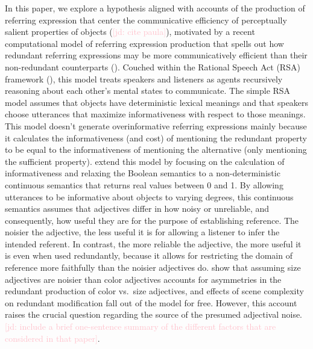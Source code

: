 \documentclass[12pt,letterpaper]{article}
\newcommand{\jd}[1]{\textcolor{Pink}{[jd: #1]}}
\begin{document}
In this paper, we explore a hypothesis aligned with accounts of the production of referring expression that center the communicative efficiency of perceptually salient properties of objects (\jd{cite paula}), motivated by a recent computational model  of referring expression production that spells out how redundant referring expressions may be more communicatively efficient than their non-redundant counterparts (\citealt{DegenEtAl2020}). Couched within the Rational Speech Act (RSA) framework (\citealt{Goodman2016}), this model treats speakers and listeners as agents recursively reasoning about each other's mental states to communicate. The simple RSA model assumes that objects have deterministic lexical meanings and that speakers choose utterances that maximize informativeness with respect to those meanings. This model doesn't generate overinformative referring expressions mainly because it calculates the informativeness (and cost) of mentioning the redundant property to be equal to the informativeness of mentioning the alternative (only mentioning the sufficient property). \citet{DegenEtAl2020} extend this model by focusing on the calculation of informativeness and relaxing the Boolean semantics to a non-deterministic continuous semantics that returns real values between 0 and 1. By allowing utterances to be informative about objects to varying degrees, this continuous semantics assumes that adjectives differ in how noisy or unreliable, and consequently, how useful they are for the purpose of establishing reference. The noisier the adjective, the less useful it is for allowing a listener to infer the intended referent. In contrast, the more reliable the adjective, the more useful it is even when used redundantly, because it allows for restricting the domain of reference more faithfully than the noisier adjectives do. \citet{DegenEtAl2020} show that assuming size adjectives are noisier than color adjectives accounts for asymmetries in the redundant production of color vs.~size adjectives, and effects of scene complexity on redundant modification fall out of the model for free. However, this account raises the crucial question regarding the source of the presumed adjectival noise. \jd{include a brief one-sentence summary of the different factors that are considered in that paper}.
\end{document}
